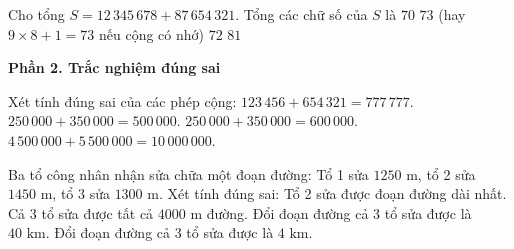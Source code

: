 \begin{ex} %
Cho tổng $S = 12\,345\,678 + 87\,654\,321$. Tổng các chữ số của $S$ là
\choice
{$70$}
{\True $73$ (hay $9 \times 8 + 1 = 73$ nếu cộng có nhớ)}
{$72$}
{$81$}
\end{ex}

\textbf{Phần 2. Trắc nghiệm đúng sai}

\begin{ex} %
Xét tính đúng sai của các phép cộng:
\choiceTF
{\True $123\,456 + 654\,321 = 777\,777$.}
{$250\,000 + 350\,000 = 500\,000$.}
{\True $250\,000 + 350\,000 = 600\,000$.}
{\True $4\,500\,000 + 5\,500\,000 = 10\,000\,000$.}
\end{ex}

\begin{ex} %
Ba tổ công nhân nhận sửa chữa một đoạn đường: Tổ 1 sửa $1250\text{ m}$, tổ 2 sửa $1450\text{ m}$, tổ 3 sửa $1300\text{ m}$. Xét tính đúng sai:
\choiceTF
{\True Tổ 2 sửa được đoạn đường dài nhất.}
{\True Cả 3 tổ sửa được tất cả $4000\text{ m}$ đường.}
{Đổi đoạn đường cả 3 tổ sửa được là $40\text{ km}$.}
{\True Đổi đoạn đường cả 3 tổ sửa được là $4\text{ km}$.}
\end{ex}

